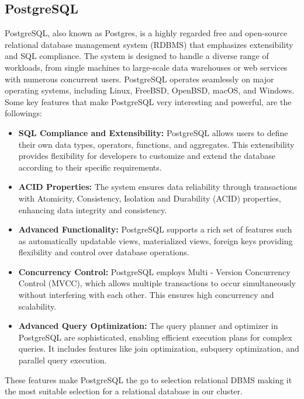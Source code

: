 \documentclass[conference]{IEEEtran}
\begin{document}
\subsection{PostgreSQL}

PostgreSQL, also known as Postgres, is a highly regarded free and open-source relational database management system (RDBMS) that emphasizes
extensibility and SQL compliance. The system is designed to handle a diverse range of workloads, from single machines to large-scale data warehouses
or web services with numerous concurrent users. PostgreSQL operates seamlessly on major operating systems, including Linux, FreeBSD, OpenBSD, macOS, and Windows.
Some key features that make PostgreSQL very interesting and powerful, are the followings:

\begin{itemize}
    \item \textbf{SQL Compliance and Extensibility:} PostgreSQL allows users to define their own data types, operators, functions, and aggregates. This extensibility
          provides flexibility for developers to customize and extend the database according to their specific requirements.
    \item \textbf{ACID Properties:} The system ensures data reliability through transactions with Atomicity, Consistency, Isolation and Durability
          (ACID) properties, enhancing data integrity and consistency.
    \item \textbf{Advanced Functionality:} PostgreSQL supports a rich set of features such as automatically updatable views, materialized views, foreign keys providing
          flexibility and control over database operations.
    \item \textbf{Concurrency Control:} PostgreSQL employs Multi - Version Concurrency Control (MVCC), which allows multiple transactions to occur simultaneously without interfering with each other. This ensures high concurrency and scalability.
    \item \textbf{Advanced Query Optimization:} The query planner and optimizer in PostgreSQL are sophisticated, enabling efficient execution plans for complex queries.
          It includes features like join optimization, subquery optimization, and parallel query execution.
\end{itemize}

These features make PostgreSQL the go to selection relational DBMS making it the most suitable selection for a relational database in our cluster.
\end{document}
